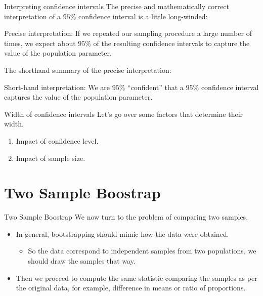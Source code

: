 \documentclass[
  ignorenonframetext,
]{beamer}
\providecommand{\tightlist}{%
  \setlength{\itemsep}{0pt}\setlength{\parskip}{0pt}}
\begin{document}
\begin{frame}{Interpreting confidence intervals}
\label{interpreting-confidence-intervals-4}
The precise and mathematically correct interpretation of a \(95\%\)
confidence interval is a little long-winded:

\begin{tcolorbox}
Precise interpretation: If we repeated our sampling procedure a large number of times, we expect about $95\%$ of the resulting confidence intervals to capture the value of the population parameter.
\end{tcolorbox}

The shorthand summary of the precise interpretation:

\begin{tcolorbox}
Short-hand interpretation: We are $95\%$ “confident” that a $95\%$ confidence interval captures the value of the population parameter.
\end{tcolorbox}
\end{frame}

\begin{frame}{Width of confidence intervals}
\label{width-of-confidence-intervals}
Let's go over some factors that determine their width.

\begin{enumerate}
\item
  Impact of confidence level.
\item
  Impact of sample size.
\end{enumerate}
\end{frame}

\section{Two Sample Boostrap}\label{two-sample-boostrap}

\begin{frame}{Two Sample Boostrap}
\label{two-sample-boostrap-1}
We now turn to the problem of comparing two samples.

\begin{itemize}
\item
  In general, bootstrapping should mimic how the data were obtained.

  \begin{itemize}
  \tightlist
  \item
    So the data correspond to independent samples from two populations,
    we should draw the samples that way.
  \end{itemize}
\item
  Then we proceed to compute the same statistic comparing the samples as
  per the original data, for example, difference in means or ratio of
  proportions.
\end{itemize}
\end{frame}
\end{document}
